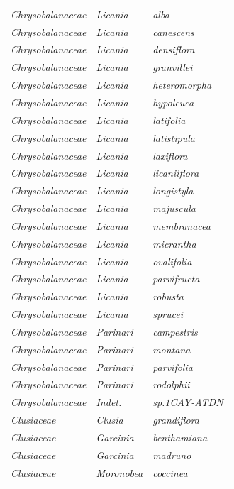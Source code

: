 \documentclass[fleqn,10pt]{ArtEcoFoG} %
\begin{document}
\begin{table}[t]
\begin{tabular}{lll}
\em{Chrysobalanaceae} & \em{Licania} & \em{alba}\\
\em{Chrysobalanaceae} & \em{Licania} & \em{canescens}\\
\em{Chrysobalanaceae} & \em{Licania} & \em{densiflora}\\
\addlinespace
\em{Chrysobalanaceae} & \em{Licania} & \em{granvillei}\\
\em{Chrysobalanaceae} & \em{Licania} & \em{heteromorpha}\\
\em{Chrysobalanaceae} & \em{Licania} & \em{hypoleuca}\\
\em{Chrysobalanaceae} & \em{Licania} & \em{latifolia}\\
\em{Chrysobalanaceae} & \em{Licania} & \em{latistipula}\\
\addlinespace
\em{Chrysobalanaceae} & \em{Licania} & \em{laxiflora}\\
\em{Chrysobalanaceae} & \em{Licania} & \em{licaniiflora}\\
\em{Chrysobalanaceae} & \em{Licania} & \em{longistyla}\\
\em{Chrysobalanaceae} & \em{Licania} & \em{majuscula}\\
\em{Chrysobalanaceae} & \em{Licania} & \em{membranacea}\\
\addlinespace
\em{Chrysobalanaceae} & \em{Licania} & \em{micrantha}\\
\em{Chrysobalanaceae} & \em{Licania} & \em{ovalifolia}\\
\em{Chrysobalanaceae} & \em{Licania} & \em{parvifructa}\\
\em{Chrysobalanaceae} & \em{Licania} & \em{robusta}\\
\em{Chrysobalanaceae} & \em{Licania} & \em{sprucei}\\
\addlinespace
\em{Chrysobalanaceae} & \em{Parinari} & \em{campestris}\\
\em{Chrysobalanaceae} & \em{Parinari} & \em{montana}\\
\em{Chrysobalanaceae} & \em{Parinari} & \em{parvifolia}\\
\em{Chrysobalanaceae} & \em{Parinari} & \em{rodolphii}\\
\em{Chrysobalanaceae} & \em{Indet.} & \em{sp.1CAY-ATDN}\\
\addlinespace
\em{Clusiaceae} & \em{Clusia} & \em{grandiflora}\\
\em{Clusiaceae} & \em{Garcinia} & \em{benthamiana}\\
\em{Clusiaceae} & \em{Garcinia} & \em{madruno}\\
\em{Clusiaceae} & \em{Moronobea} & \em{coccinea}\\

\end{tabular}
\end{table}
\end{document}
